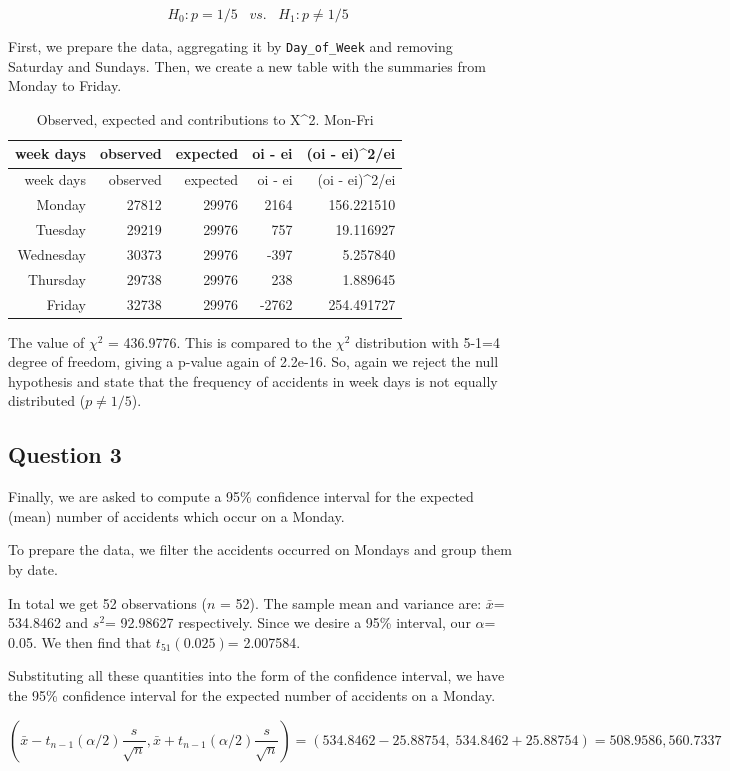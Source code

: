 \documentclass[]{article}
\begin{document}
\[H_{0}: p=1/5\;\;\;vs.\;\;\;H_{1}:p\neq1/5\;\]

First, we prepare the data, aggregating it by \texttt{Day\_of\_Week} and
removing Saturday and Sundays. Then, we create a new table with the
summaries from Monday to Friday.

\begin{longtable}[]{@{}rrrrr@{}}
\caption{Observed, expected and contributions to X\^{}2.
Mon-Fri}\tabularnewline
\toprule
week days & observed & expected & oi - ei & (oi -
ei)\^{}2/ei\tabularnewline
\midrule
\endfirsthead
\toprule
week days & observed & expected & oi - ei & (oi -
ei)\^{}2/ei\tabularnewline
\midrule
\endhead
Monday & 27812 & 29976 & 2164 & 156.221510\tabularnewline
Tuesday & 29219 & 29976 & 757 & 19.116927\tabularnewline
Wednesday & 30373 & 29976 & -397 & 5.257840\tabularnewline
Thursday & 29738 & 29976 & 238 & 1.889645\tabularnewline
Friday & 32738 & 29976 & -2762 & 254.491727\tabularnewline
\bottomrule
\end{longtable}

The value of \(\chi ^2\) = 436.9776. This is compared to the \(\chi ^2\)
distribution with 5-1=4 degree of freedom, giving a p-value again of
2.2e-16. So, again we reject the null hypothesis and state that the
frequency of accidents in week days is not equally distributed
(\(p\neq1/5\)).

\subsection{Question 3}\label{question-3}

Finally, we are asked to compute a 95\% confidence interval for the
expected (mean) number of accidents which occur on a Monday.

To prepare the data, we filter the accidents occurred on Mondays and
group them by date.

In total we get 52 observations (\(n\) = 52). The sample mean and
variance are: \(\bar{x}\)= 534.8462 and \(s^2\)= 92.98627 respectively.
Since we desire a 95\% interval, our \(\alpha\)= 0.05. We then find that
\(t_{51}(0.025)\)= 2.007584.

Substituting all these quantities into the form of the confidence
interval, we have the 95\% confidence interval for the expected number
of accidents on a Monday.

\[\left ( \bar{x} -t_{n-1}(\alpha /2)\frac{s}{\sqrt{n}}, \bar{x} +t_{n-1}(\alpha /2)\frac{s}{\sqrt{n}}\right) = (534.8462-25.88754,\; 534.8462+25.88754) = 508.9586, 560.7337 \]
\end{document}
